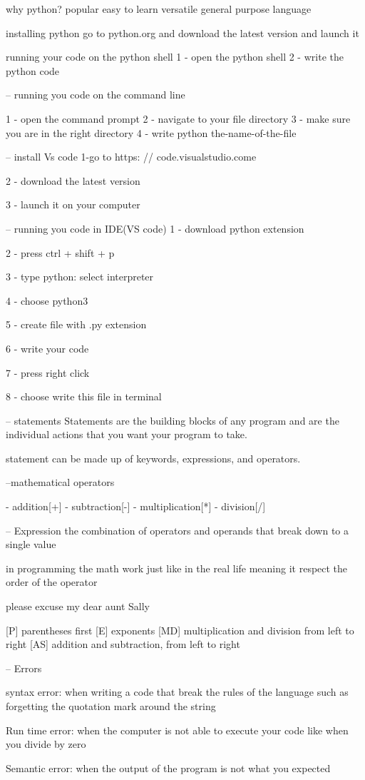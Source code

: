 why python?
popular
easy to learn
versatile
general purpose language


installing python
go to   python.org
and download the latest version
and launch it

running your code on the python shell
1 - open the python shell
2 - write the python code


-- running you code on the command line

1 - open the command prompt
2 - navigate to your file directory
3 - make sure you are in the right directory
4 - write    python the-name-of-the-file


-- install Vs code
1-go to  https: // code.visualstudio.come

2 - download the latest version

3 - launch it on your computer

-- running you code in IDE(VS code)
1 - download python extension

2 - press ctrl + shift + p

3 - type python: select interpreter

4 - choose python3

5 - create file with .py extension

6 - write your code

7 - press right click

8 - choose write this file in terminal


-- statements
Statements are the building blocks of any program and are the individual actions that you want your program to take.

statement can be made up of keywords, expressions, and operators.

--mathematical  operators

- addition[+]
- subtraction[-]
- multiplication[*]
- division[/]

-- Expression
the combination of operators and operands that break down to a single value

in programming the math work just like in the real life
meaning it respect the order of the operator

please excuse my dear aunt Sally

[P] parentheses first
[E] exponents
[MD] multiplication and division from left to right
[AS] addition and subtraction, from left to right


-- Errors

syntax error:
    when writing a code that break the rules of the language such as forgetting the quotation mark around the string

Run time error:
    when the computer is not able to execute your code like when you divide by zero

Semantic error:
    when the output of the program is not what you expected

